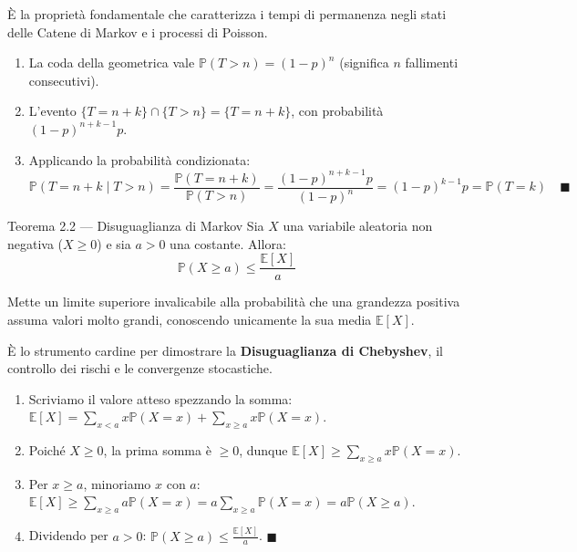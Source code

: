 \documentclass[11pt,a4paper]{report}
\newcommand{\PP}{\mathbb{P}}
\newcommand{\E}{\mathbb{E}}
\newcommand{\1}{\mathbf{1}}
\begin{document}
\begin{acosaserve}
È la proprietà fondamentale che caratterizza i tempi di permanenza negli stati delle Catene di Markov e i processi di Poisson.
\end{acosaserve}

\begin{dimostrazione}
\begin{enumerate}
    \item La coda della geometrica vale $\PP(T > n) = (1-p)^n$ (significa $n$ fallimenti consecutivi).
    \item L'evento $\{T = n+k\} \cap \{T > n\} = \{T = n+k\}$, con probabilità $(1-p)^{n+k-1}p$.
    \item Applicando la probabilità condizionata:
    \[ \PP(T = n+k \mid T > n) = \frac{\PP(T = n+k)}{\PP(T > n)} = \frac{(1-p)^{n+k-1}p}{(1-p)^n} = (1-p)^{k-1}p = \PP(T = k) \quad \blacksquare \]
\end{enumerate}
\end{dimostrazione}

\vspace{0.4cm}

\begin{teoremabox}{Teorema 2.2 --- Disuguaglianza di Markov}
Sia $X$ una variabile aleatoria non negativa ($X \ge 0$) e sia $a > 0$ una costante. Allora:
\[ \PP(X \ge a) \le \frac{\E[X]}{a} \]
\end{teoremabox}

\begin{cosafa}
Mette un limite superiore invalicabile alla probabilità che una grandezza positiva assuma valori molto grandi, conoscendo unicamente la sua media $\E[X]$.
\end{cosafa}

\begin{acosaserve}
È lo strumento cardine per dimostrare la \textbf{Disuguaglianza di Chebyshev}, il controllo dei rischi e le convergenze stocastiche.
\end{acosaserve}

\begin{dimostrazione}
\begin{enumerate}
    \item Scriviamo il valore atteso spezzando la somma: $\E[X] = \sum_{x < a} x \PP(X=x) + \sum_{x \ge a} x \PP(X=x)$.
    \item Poiché $X \ge 0$, la prima somma è $\ge 0$, dunque $\E[X] \ge \sum_{x \ge a} x \PP(X=x)$.
    \item Per $x \ge a$, minoriamo $x$ con $a$: $\E[X] \ge \sum_{x \ge a} a \PP(X=x) = a \sum_{x \ge a} \PP(X=x) = a \PP(X \ge a)$.
    \item Dividendo per $a > 0$: $\PP(X \ge a) \le \frac{\E[X]}{a}$. $\blacksquare$
\end{enumerate}
\end{dimostrazione}
\end{document}
